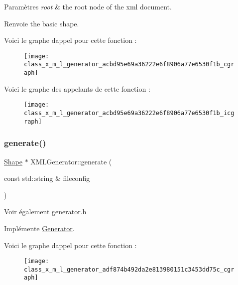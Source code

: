 \begin{DoxyParams}{Paramètres}
{\em root} & the root node of the xml document. \\
\hline
\end{DoxyParams}
\begin{DoxyReturn}{Renvoie}
the basic shape. 
\end{DoxyReturn}
Voici le graphe d\textquotesingle{}appel pour cette fonction \+:\nopagebreak
\begin{figure}[H]
\begin{center}
\leavevmode
\texttt{[image: class\_x\_m\_l\_generator\_acbd95e69a36222e6f8906a77e6530f1b\_cgraph]}
\end{center}
\end{figure}
Voici le graphe des appelants de cette fonction \+:\nopagebreak
\begin{figure}[H]
\begin{center}
\leavevmode
\texttt{[image: class\_x\_m\_l\_generator\_acbd95e69a36222e6f8906a77e6530f1b\_icgraph]}
\end{center}
\end{figure}
\mbox{\label{class_x_m_l_generator_adf874b492da2e813980151c3453dd75c}} 
\subsubsection{\texorpdfstring{generate()}{generate()}}
{\footnotesize\ttfamily \hyperlink{class_shape}{Shape} $\ast$ X\+M\+L\+Generator\+::generate (\begin{DoxyParamCaption}\item[{const std\+::string \&}]{fileconfig }\end{DoxyParamCaption})\hspace{0.3cm}{\ttfamily [virtual]}}

\begin{DoxySeeAlso}{Voir également}
\hyperlink{generator_8h}{generator.\+h} 
\end{DoxySeeAlso}


Implémente \hyperlink{class_generator_a0a421843bba544df32c3e10478eaabc7}{Generator}.

Voici le graphe d\textquotesingle{}appel pour cette fonction \+:\nopagebreak
\begin{figure}[H]
\begin{center}
\leavevmode
\texttt{[image: class\_x\_m\_l\_generator\_adf874b492da2e813980151c3453dd75c\_cgraph]}
\end{center}
\end{figure}
\mbox{\label{class_x_m_l_generator_a0030450c03ad82fe328e27382bcfe011}} 
